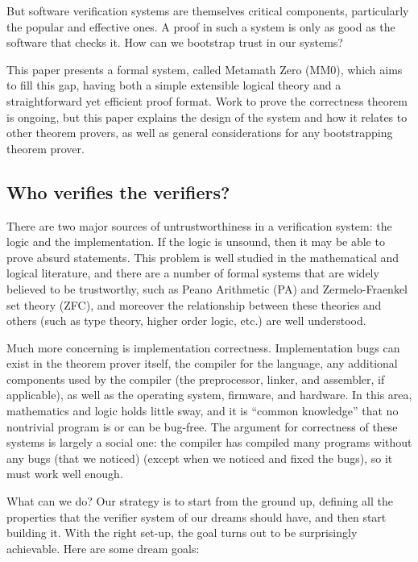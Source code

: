 \documentclass[runningheads]{llncs}
\newcommand{\mmO}{\textsf{MM0}}
\begin{document}
But software verification systems are themselves critical components, particularly the popular and effective ones. A proof in such a system is only as good as the software that checks it. How can we bootstrap trust in our systems?

This paper presents a formal system, called Metamath Zero (\mmO), which aims to fill this gap, having both a simple extensible logical theory and a straightforward yet efficient proof format. Work to prove the correctness theorem is ongoing, but this paper explains the design of the system and how it relates to other theorem provers, as well as general considerations for any bootstrapping theorem prover.

\subsection{Who verifies the verifiers?}

There are two major sources of untrustworthiness in a verification system: the logic and the implementation. If the logic is unsound, then it may be able to prove absurd statements. This problem is well studied in the mathematical and logical literature, and there are a number of formal systems that are widely believed to be trustworthy, such as Peano Arithmetic (\textsf{PA}) and Zermelo-Fraenkel set theory (\textsf{ZFC}), and moreover the relationship between these theories and others (such as type theory, higher order logic, etc.) are well understood.

Much more concerning is implementation correctness. Implementation bugs can exist in the theorem prover itself, the compiler for the language, any additional components used by the compiler (the preprocessor, linker, and assembler, if applicable), as well as the operating system, firmware, and hardware. In this area, mathematics and logic holds little sway, and it is ``common knowledge'' that no nontrivial program is or can be bug-free. The argument for correctness of these systems is largely a social one: the compiler has compiled many programs without any bugs (that we noticed) (except when we noticed and fixed the bugs), so it must work well enough.

What can we do? Our strategy is to start from the ground up, defining all the properties that the verifier system of our dreams should have, and then start building it. With the right set-up, the goal turns out to be surprisingly achievable. Here are some dream goals:
\end{document}
